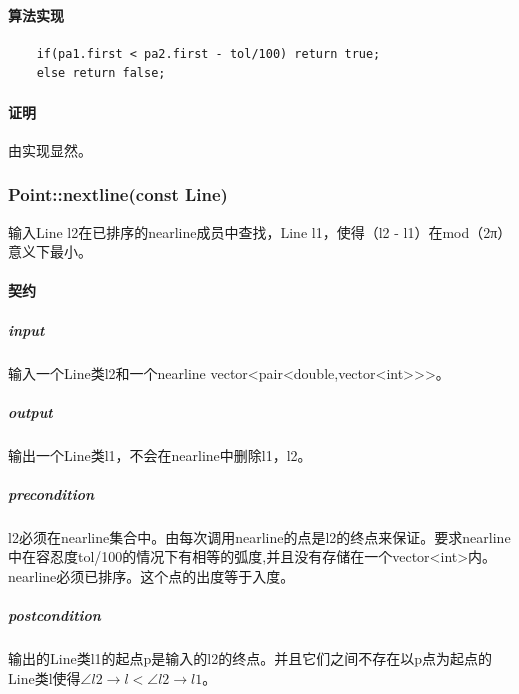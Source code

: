 \documentclass[a4paper]{book}
\numberwithin{equation}{chapter}
\theoremstyle{definition}
\begin{document}
\paragraph{算法实现}
\begin{lstlisting}
	if(pa1.first < pa2.first - tol/100) return true;
	else return false;
\end{lstlisting}
\paragraph{证明}
由实现显然。

\subsubsection{Point::nextline(const Line)}
输入Line l2在已排序的nearline成员中查找，Line l1，使得（l2 - l1）在mod（2π）意义下最小。
\paragraph{契约}
\subparagraph{input}
输入一个Line类l2和一个nearline  vector<pair<double,vector<int>>>。
\subparagraph{output}
输出一个Line类l1，不会在nearline中删除l1，l2。
\subparagraph{precondition}
l2必须在nearline集合中。由每次调用nearline的点是l2的终点来保证。要求nearline中在容忍度tol/100的情况下有相等的弧度,并且没有存储在一个vector<int>内。nearline必须已排序。这个点的出度等于入度。
\subparagraph{postcondition}
输出的Line类l1的起点p是输入的l2的终点。并且它们之间不存在以p点为起点的Line类l使得$\angle l2 \rightarrow l < \angle l2 \rightarrow l1$。
\end{document}
